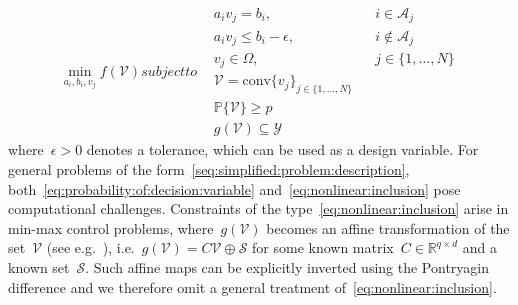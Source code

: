 \documentclass[letterpaper, 10pt, conference]{ieeeconf} %
\providecommand{\conv}{\text{conv}}
\begin{document}
\begin{subequations}\label{seq:simplified:problem:description}
\begin{equation}
	\min_{a_i,b_i,v_j} f(\mathcal V) %
\end{equation}
%
subject to
%
\begin{alignat}{2}
        & a_i v_j=b_i, & & i\in\mathcal A_j\\
	& a_i v_j\leq b_i-\epsilon, & & i\not\in\mathcal A_j \\
%
	& v_j\in\Omega,  & & j\in\{1,\dots,N\} \\
%
	& \mathcal V = \conv\{v_j\}_{j\in\{1,\dots,N\}} \\
%
\label{eq:probability:of:decision:variable}
	& \mathbb P\{\mathcal V\}\geq p \\
%
\label{eq:nonlinear:inclusion}
	& g(\mathcal V)\subseteq\mathcal Y
\end{alignat}
\end{subequations}
%
where~$\epsilon>0$ denotes a tolerance, which can be used as a design variable.
%
For general problems of the form~\eqref{seq:simplified:problem:description}, both~\eqref{eq:probability:of:decision:variable} and~\eqref{eq:nonlinear:inclusion} pose computational challenges.
%
Constraints of the type~\eqref{eq:nonlinear:inclusion} arise in min-max control problems, where~$g(\mathcal V)$ becomes an affine transformation of the set~$\mathcal V$ (see e.g.~\cite{Schaich:2017}), i.e.~$g(\mathcal V) = C\mathcal V\oplus \mathcal S$ for some known matrix~$C\in\mathbb R^{q\times d}$ and a known set~$\mathcal S$. 
%
Such affine maps can be explicitly inverted using the Pontryagin difference and we therefore omit a general treatment of~\eqref{eq:nonlinear:inclusion}.
%
\end{document}

